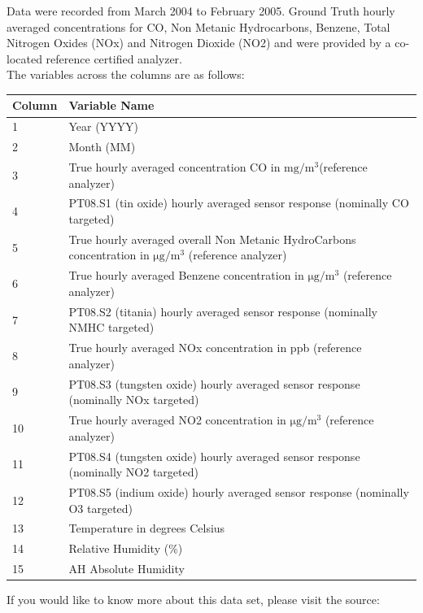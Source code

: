 \documentclass[12pt]{article}
\begin{document}
Data were recorded from March 2004 to February 2005. Ground Truth hourly averaged concentrations for CO, Non Metanic Hydrocarbons, Benzene, Total Nitrogen Oxides (NOx) and Nitrogen Dioxide (NO2) and were provided by a co-located reference certified analyzer.\\

The variables across the columns are as follows:
\begin{table}[h] \footnotesize
\begin{tabular}{p{2cm} p{13.5cm}}
\toprule
\textbf{Column} & \textbf{Variable Name}\\
\midrule
1 & Year (YYYY)\\
2 & Month	(MM)\\
3 & True hourly averaged concentration CO in $\si{\milli\gram
\per\meter^3}$(reference analyzer)\\ 
4 & PT08.S1 (tin oxide) hourly averaged sensor response (nominally CO targeted)\\
5 & True hourly averaged overall Non Metanic HydroCarbons concentration in $\si{\micro\gram\per\meter^3}$ (reference analyzer)\\
6 & True hourly averaged Benzene concentration in $\si{\micro\gram\per\meter^3}$ (reference analyzer)\\
7 & PT08.S2 (titania) hourly averaged sensor response (nominally NMHC targeted)\\	
8 & True hourly averaged NOx concentration in ppb (reference analyzer)\\
9 & PT08.S3 (tungsten oxide) hourly averaged sensor response (nominally NOx targeted)\\
10 & True hourly averaged NO2 concentration in $\si{\micro\gram\per\meter^3}$ (reference analyzer)\\
11 & PT08.S4 (tungsten oxide) hourly averaged sensor response (nominally NO2 targeted)\\
12 & PT08.S5 (indium oxide) hourly averaged sensor response (nominally O3 targeted)\\
13 & Temperature in degrees Celsius\\	
14 & Relative Humidity (\%)\\
15 & AH Absolute Humidity\\
\bottomrule
\end{tabular}
\end{table}

\newpage

If you would like to know more about this data set, please visit the source:\\
\end{document}
